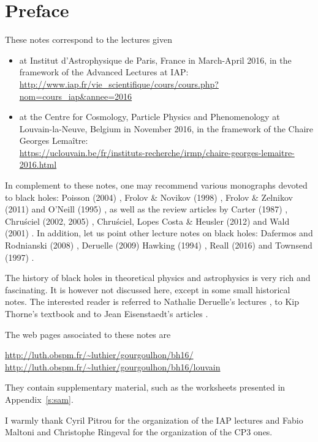 \chapter*{Preface}

These notes correspond to the lectures given
\begin{itemize}
\item at
Institut d'Astrophysique de Paris, France in March-April 2016, in the
framework of the Advanced Lectures at IAP:\\
\url{http://www.iap.fr/vie_scientifique/cours/cours.php?nom=cours_iap&annee=2016}
\item at the Centre for Cosmology, Particle Physics and Phenomenology at Louvain-la-Neuve,
Belgium in November 2016, in the framework of the Chaire Georges Lemaître:\\
\url{https://uclouvain.be/fr/instituts-recherche/irmp/chaire-georges-lemaitre-2016.html}
\end{itemize}

\vspace{2ex}

In complement to these notes, one may recommend various monographs
devoted to black holes: Poisson (2004) \cite{Poiss04}, Frolov \& Novikov (1998) \cite{FroloN98},
Frolov \& Zelnikov (2011) \cite{FroloZ11} and O'Neill (1995) \cite{ONeil95}, as well as the review
articles by Carter (1987) \cite{Carte87}, Chru\'sciel (2002, 2005) \cite{Chrus02, Chrus05},
Chru\'sciel, Lopes Costa \& Heusler (2012) \cite{ChrusLH12} and Wald (2001) \cite{Wald01}.
In addition, let us point other lecture notes on black holes:
Dafermos and Rodnianski (2008) \cite{DaferR13},  Deruelle (2009) \cite{Derue09}
Hawking (1994) \cite{Hawki94,HawkiP15}, Reall (2016) \cite{Reall16} and Townsend (1997) \cite{Towns97}.

The history of black holes in theoretical physics and astrophysics is
very rich and fascinating. It is however not discussed here, except in some
small historical notes. The interested
reader is referred to Nathalie Deruelle's lectures \cite{Derue09}, to Kip Thorne's
textbook \cite{Thorn94} and to Jean Eisenstaedt's articles \cite{Eisen82,Eisen93}.


The web pages associated to these notes are

\begin{center}
\url{http://luth.obspm.fr/~luthier/gourgoulhon/bh16/}\\
\url{http://luth.obspm.fr/~luthier/gourgoulhon/bh16/louvain}
\end{center}

They contain supplementary material, such as the worksheets presented in
Appendix~\ref{s:sam}.

\vspace{2ex}

I warmly thank Cyril Pitrou for the organization of the IAP lectures
and Fabio Maltoni and Christophe Ringeval for the organization of the CP3 ones.
